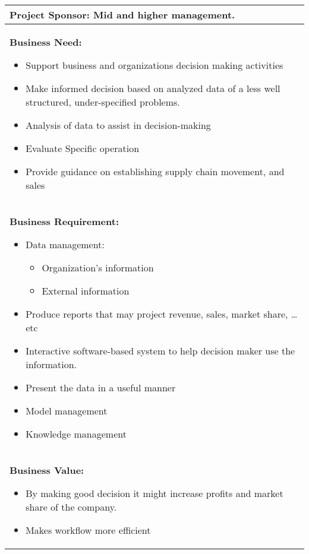\documentclass[12pt]{article}
\begin{document}
\begin{center}
    \begin{longtable}{p{}}
        \toprule
        \textbf{Project Sponsor:} Mid and higher management.                                                     \\
        \midrule
        \textbf{Business Need:}
        \begin{itemize}
            \item{Support business and organizations decision making activities}
            \item{Make informed decision based on analyzed data of a less well structured, under-specified problems.}
            \item{Analysis of data to assist in decision-making}
            \item Evaluate Specific operation
            \item Provide guidance on establishing supply chain movement, and sales
        \end{itemize} \\
        \midrule
        \textbf{Business Requirement:}
        \begin{itemize}
            \item Data management:
                  \begin{itemize}
                      \item Organization's information
                      \item External information
                  \end{itemize}
            \item Produce reports that may project revenue, sales, market share, \ldots etc
            \item Interactive software-based system to help decision maker use the information.
            \item Present the data in a useful manner
            \item Model management
            \item Knowledge management
        \end{itemize}                       \\
        \midrule
        \textbf{Business Value:}
        \begin{itemize}
            \item By making good decision it might increase profits and market share of the company.
            \item Makes workflow more efficient

\end{itemize}
\end{longtable}
\end{center}
\end{document}
